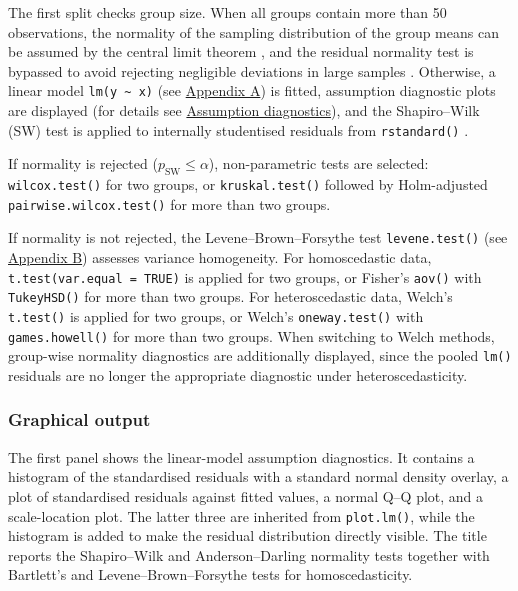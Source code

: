 The first split checks group size. When all groups contain more than 50
observations, the normality of the sampling distribution of the group
means can be assumed by the central limit theorem \citep{Lumley:2002, Rasch:2011}, and the residual normality test is bypassed to avoid
rejecting negligible deviations in large samples \citep{Ghasemi:2012, Fagerland:2012, Shatz:2024}. Otherwise, a linear model \texttt{lm(y\ \textasciitilde{}\ x)}
(see \hyperref[glm]{Appendix A}) is fitted, assumption diagnostic plots are
displayed (for details see \hyperref[assumptions]{Assumption diagnostics}), and
the Shapiro--Wilk (SW) test \citep{Shapiro:1965} is applied to internally
studentised residuals from \texttt{rstandard()} \citep{Cook:1982}.

If normality is rejected (\(p_\text{SW} \le \alpha\)), non-parametric
tests are selected: \texttt{wilcox.test()} \citep{Mann:1947} for two groups, or
\texttt{kruskal.test()} \citep{Kruskal:1952} followed by Holm-adjusted
\texttt{pairwise.wilcox.test()} \citep{Holm:1979} for more than two groups.

If normality is not rejected, the Levene--Brown--Forsythe test
\texttt{levene.test()} \citep{Brown:1974} (see \hyperref[tests]{Appendix B}) assesses
variance homogeneity. For homoscedastic data,
\texttt{t.test(var.equal\ =\ TRUE)} is applied for two groups, or Fisher's
\texttt{aov()} with \texttt{TukeyHSD()} for more than two groups. For
heteroscedastic data, Welch's \texttt{t.test()} \citep{Welch:1947, Satterthwaite:1946} is applied for two groups, or Welch's
\texttt{oneway.test()} \citep{Welch:1951} with \texttt{games.howell()} \citep{Games:1976} for
more than two groups. When switching to Welch methods, group-wise
normality diagnostics are additionally displayed, since the pooled
\texttt{lm()} residuals are no longer the appropriate diagnostic under
heteroscedasticity.

\subsubsection*{Graphical output}\label{graphical-output}

The first panel shows the linear-model assumption diagnostics. It
contains a histogram of the standardised residuals with a standard
normal density overlay, a plot of standardised residuals against fitted
values, a normal Q--Q plot, and a scale-location plot. The latter three
are inherited from \texttt{plot.lm()}, while the histogram is added to make the
residual distribution directly visible. The title reports the
Shapiro--Wilk and Anderson--Darling normality tests together with
Bartlett's and Levene--Brown--Forsythe tests for homoscedasticity.

